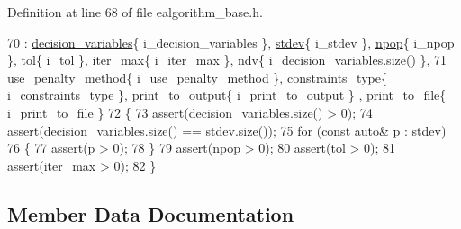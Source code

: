 Definition at line 68 of file ealgorithm\+\_\+base.\+h.


\begin{DoxyCode}
70             : \hyperlink{structea_1_1_e_a__base_a71e09437e78efc6e93e0a6e510d13100}{decision\_variables}\{ i\_decision\_variables \}, 
      \hyperlink{structea_1_1_e_a__base_a28216728d1e1355337d8bf2a484d5569}{stdev}\{ i\_stdev \}, \hyperlink{structea_1_1_e_a__base_a41b6ed30e866d5f6a782a90e6a1b0f79}{npop}\{ i\_npop \}, \hyperlink{structea_1_1_e_a__base_a9b7a33797adc1cbeab7a9f3786c41a27}{tol}\{ i\_tol \}, \hyperlink{structea_1_1_e_a__base_affe85fad1da440e091a9d09cf46d502f}{iter\_max}\{ i\_iter\_max \}, 
      \hyperlink{structea_1_1_e_a__base_a6996abed1c0b9642bdae67547fa6474c}{ndv}\{ i\_decision\_variables.size() \},
71             \hyperlink{structea_1_1_e_a__base_ad3b4a962208b72c67b663ba0d40bebfb}{use\_penalty\_method}\{ i\_use\_penalty\_method \}, 
      \hyperlink{structea_1_1_e_a__base_a8f6f21a54d24fa69833cfd1a59beeed3}{constraints\_type}\{ i\_constraints\_type \}, \hyperlink{structea_1_1_e_a__base_aea758485e2120469ca02c52c7cff9e5a}{print\_to\_output}\{ i\_print\_to\_output \}
      , \hyperlink{structea_1_1_e_a__base_a9ad71465eab92ffd0fe98b625d2d15bc}{print\_to\_file}\{ i\_print\_to\_file \}
72         \{
73             assert(\hyperlink{structea_1_1_e_a__base_a71e09437e78efc6e93e0a6e510d13100}{decision\_variables}.size() > 0);
74             assert(\hyperlink{structea_1_1_e_a__base_a71e09437e78efc6e93e0a6e510d13100}{decision\_variables}.size() == \hyperlink{structea_1_1_e_a__base_a28216728d1e1355337d8bf2a484d5569}{stdev}.size());
75             \textcolor{keywordflow}{for} (\textcolor{keyword}{const} \textcolor{keyword}{auto}& p : \hyperlink{structea_1_1_e_a__base_a28216728d1e1355337d8bf2a484d5569}{stdev})
76             \{
77                 assert(p > 0);
78             \}
79             assert(\hyperlink{structea_1_1_e_a__base_a41b6ed30e866d5f6a782a90e6a1b0f79}{npop} > 0);
80             assert(\hyperlink{structea_1_1_e_a__base_a9b7a33797adc1cbeab7a9f3786c41a27}{tol} > 0);
81             assert(\hyperlink{structea_1_1_e_a__base_affe85fad1da440e091a9d09cf46d502f}{iter\_max} > 0);
82         \}
\end{DoxyCode}


\subsection{Member Data Documentation}
\mbox{\label{structea_1_1_e_a__base_a8f6f21a54d24fa69833cfd1a59beeed3}} 
